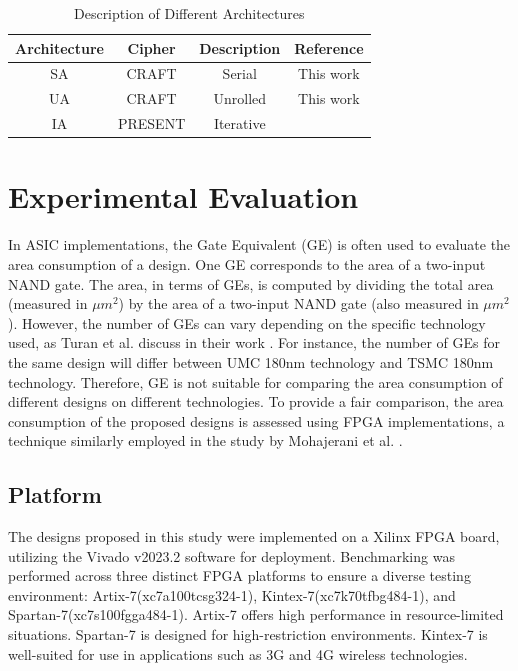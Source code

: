 \documentclass[final,5p,times,twocolumn]{elsarticle}
\begin{document}
\begin{table}[h]
    \centering
    \caption{Description of Different Architectures}\label{tab2}%
    \begin{tabular}{|c|c|c|c|}
        \hline
        Architecture & Cipher  & Description & Reference           \\
        \hline
        SA           & CRAFT   & Serial      & This work           \\
        UA           & CRAFT   & Unrolled    & This work           \\
        IA           & PRESENT & Iterative   & \cite{Bharathi2022} \\
        \hline
    \end{tabular}
\end{table}


\section{Experimental Evaluation}\label{sec4}

In ASIC implementations, the Gate Equivalent (GE) is often used to evaluate the area consumption of a design.
One GE corresponds to the area of a two-input NAND gate. The area, in terms of GEs, is computed by dividing the total area (measured in $\mu m^2$) by the area of a two-input NAND gate (also measured in $\mu m^2$).
However, the number of GEs can vary depending on the specific technology used, as Turan et al. discuss in their work \cite{Turan}.
For instance, the number of GEs for the same design will differ between UMC 180nm technology and TSMC 180nm technology.
Therefore, GE is not suitable for comparing the area consumption of different designs on different technologies.
To provide a fair comparison, the area consumption of the proposed designs is assessed using FPGA implementations, a technique similarly employed in the study by Mohajerani et al. \cite{Mohajerani2020}.

\subsection{Platform}\label{subsec4}

The designs proposed in this study were implemented on a Xilinx FPGA board, utilizing the Vivado v2023.2 software for deployment.
Benchmarking was performed across three distinct FPGA platforms to ensure a diverse testing environment: Artix-7(xc7a100tcsg324-1), Kintex-7(xc7k70tfbg484-1), and Spartan-7(xc7s100fgga484-1).
Artix-7 offers high performance in resource-limited situations. Spartan-7 is designed for high-restriction environments. Kintex-7 is well-suited for use in applications such as 3G and 4G wireless technologies.
\end{document}
